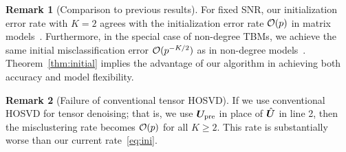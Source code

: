 \documentclass[lettersize,journal]{IEEEtran}
\theoremstyle{definition}
\theoremstyle{definition}
\newtheorem{rmk}{Remark}
\begin{document}
\begin{rmk}[Comparison to previous results] For fixed SNR, our initialization error rate with $K=2$ agrees with the initialization error rate $\mathcal{O}(p)$ in matrix models~\citep{gao2018community}. Furthermore, in the special case of non-degree TBMs, we achieve the same initial misclassification error $\mathcal{O}(p^{-K/2})$ as in non-degree models~\citep{han2020exact}. Theorem~\ref{thm:initial} implies the advantage of our algorithm in achieving both accuracy and model flexibility. 
\end{rmk}





\begin{rmk}[Failure of conventional tensor HOSVD] If we use conventional HOSVD for tensor denoising; that is, we use $\bm{U}_{\text{pre}}$ in place of $\hat {\bm{U}}$ in line 2, then the misclustering rate becomes $\mathcal{O}(p)$ for all $K\geq 2$. This rate is substantially worse than our current rate~\eqref{eq:ini}.
\end{rmk}
\end{document}
